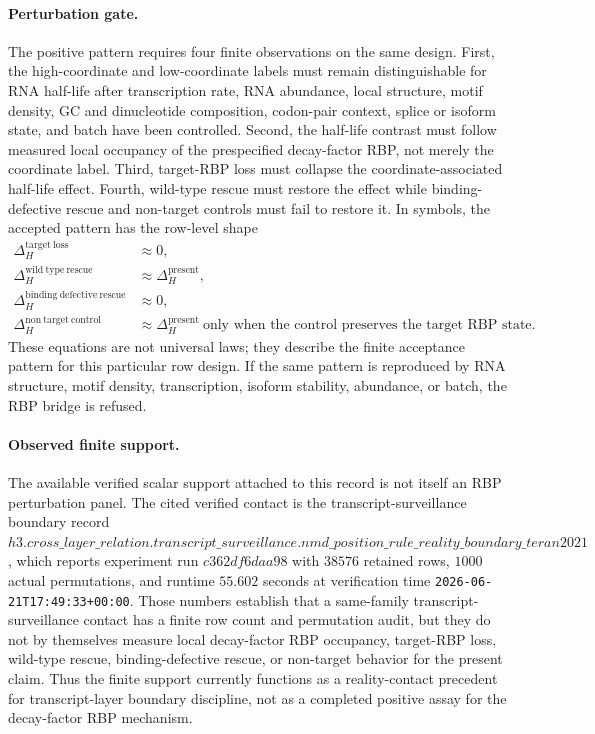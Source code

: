 \paragraph{Perturbation gate.}
The positive pattern requires four finite observations on the same design.  First, the high-coordinate and low-coordinate labels must remain distinguishable for RNA half-life after transcription rate, RNA abundance, local structure, motif density, GC and dinucleotide composition, codon-pair context, splice or isoform state, and batch have been controlled.  Second, the half-life contrast must follow measured local occupancy of the prespecified decay-factor RBP, not merely the coordinate label.  Third, target-RBP loss must collapse the coordinate-associated half-life effect.  Fourth, wild-type rescue must restore the effect while binding-defective rescue and non-target controls must fail to restore it.  In symbols, the accepted pattern has the row-level shape
$$
\begin{aligned}
\Delta_H^{\mathrm{target\ loss}} &\approx 0,\\
\Delta_H^{\mathrm{wild\ type\ rescue}} &\approx \Delta_H^{\mathrm{present}},\\
\Delta_H^{\mathrm{binding\ defective\ rescue}} &\approx 0,\\
\Delta_H^{\mathrm{non\ target\ control}} &\approx \Delta_H^{\mathrm{present}}\ \text{only when the control preserves the target RBP state.}
\end{aligned}
$$
These equations are not universal laws; they describe the finite acceptance pattern for this particular row design.  If the same pattern is reproduced by RNA structure, motif density, transcription, isoform stability, abundance, or batch, the RBP bridge is refused.

\paragraph{Observed finite support.}
The available verified scalar support attached to this record is not itself an RBP perturbation panel.  The cited verified contact is the transcript-surveillance boundary record $h3.cross\_layer\_relation.transcript\_surveillance.nmd\_position\_rule\_reality\_boundary\_teran2021$, which reports experiment run $c362df6daa98$ with $38576$ retained rows, $1000$ actual permutations, and runtime $55.602$ seconds at verification time \texttt{2026-06-21T17:49:33+00:00}.  Those numbers establish that a same-family transcript-surveillance contact has a finite row count and permutation audit, but they do not by themselves measure local decay-factor RBP occupancy, target-RBP loss, wild-type rescue, binding-defective rescue, or non-target behavior for the present claim.  Thus the finite support currently functions as a reality-contact precedent for transcript-layer boundary discipline, not as a completed positive assay for the decay-factor RBP mechanism.

